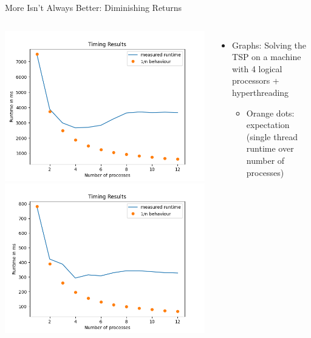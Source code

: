 
\begin{frame}{More Isn't Always Better: Diminishing Returns}
%
\begin{columns}
\includegraphics[width=\linewidth]{./gfx/04-cpu-count-1}
\includegraphics[width=\linewidth]{./gfx/04-cpu-count-2}
%
\begin{itemize}
\item Graphs: Solving the TSP on a machine with 4 logical processors + hyperthreading
	\begin{itemize}
	\item Orange dots: expectation (single thread runtime over number of processes)

\end{itemize}
\end{itemize}
\end{columns}
\end{frame}
